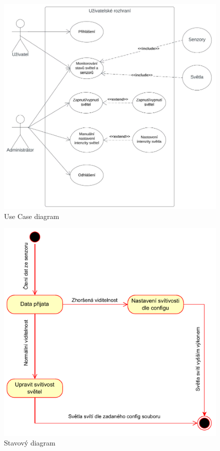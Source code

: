 \begin{figure}[H]
    \centering\includegraphics[width=.8\textwidth]{Figures/use_case_diagram_enviro.pdf}   
    \caption{Use Case diagram}
    \label{Obr-Use_Case_Diagram}
\end{figure}

\begin{figure}[H]
    \centering\includegraphics[width=.6\textwidth]{Figures/stavovy_diagram.drawio.pdf}   
    \caption{Stavový diagram}
    \label{Obr-Stavovy_Diagram}
\end{figure}


\endinput
